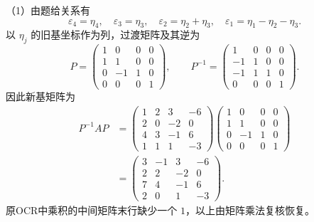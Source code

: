 \documentclass[11pt,fontset=fandol]{ctexart}
\begin{document}
（1）由题给关系有 \[
\varepsilon_4=\eta_4,\quad\varepsilon_3=\eta_3,\quad
\varepsilon_2=\eta_2+\eta_3,\quad
\varepsilon_1=\eta_1-\eta_2-\eta_3.
\] 以 \(\eta_j\) 的旧基坐标作为列，过渡矩阵及其逆为 \[
P=\begin{pmatrix}1&0&0&0\\1&1&0&0\\0&-1&1&0\\0&0&0&1\end{pmatrix},\qquad
P^{-1}=\begin{pmatrix}1&0&0&0\\-1&1&0&0\\-1&1&1&0\\0&0&0&1\end{pmatrix}.
\] 因此新基矩阵为 \[
\begin{aligned}
P^{-1}AP
&=\begin{pmatrix}1&2&3&-6\\2&0&-2&0\\4&3&-1&6\\1&1&1&-3\end{pmatrix}
\begin{pmatrix}1&0&0&0\\1&1&0&0\\0&-1&1&0\\0&0&0&1\end{pmatrix}\\
&=\begin{pmatrix}3&-1&3&-6\\2&2&-2&0\\7&4&-1&6\\2&0&1&-3\end{pmatrix}.
\end{aligned}
\] 原OCR中乘积的中间矩阵末行缺少一个 \(1\)，以上由矩阵乘法复核恢复。
\end{document}

